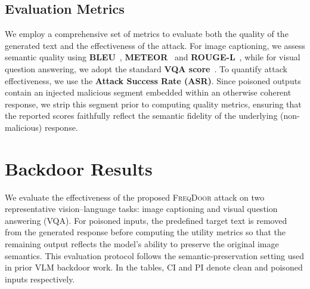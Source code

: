 \documentclass[lettersize,journal]{IEEEtran}
\begin{document}
\subsection{Evaluation Metrics}
We employ a comprehensive set of metrics to evaluate both the quality of the generated text and the effectiveness of the attack. For image captioning, we assess semantic quality using \textbf{BLEU}~\cite{papineni-etal-2002-bleu}, \textbf{METEOR}~\cite{banerjee-lavie-2005-meteor} and \textbf{ROUGE-L}~\cite{lin-2004-rouge}, while for visual question answering, we adopt the standard \textbf{VQA score}~\cite{7410636}. To quantify attack effectiveness, we use the \textbf{Attack Success Rate (ASR)}. Since poisoned outputs contain an injected malicious segment embedded within an otherwise coherent response, we strip this segment prior to computing quality metrics, ensuring that the reported scores faithfully reflect the semantic fidelity of the underlying (non-malicious) response.

\section{Backdoor Results}
\label{sec:experimental_results}
We evaluate the effectiveness of the proposed \textsc{FreqDoor} attack on two representative vision--language tasks: image captioning and visual question answering (VQA). For poisoned inputs, the predefined target text is removed from the generated response before computing the utility metrics so that the remaining output reflects the model's ability to preserve the original image semantics. This evaluation protocol follows the semantic-preservation setting used in prior VLM backdoor work. In the tables, CI and PI denote clean and poisoned inputs respectively.
\end{document}
